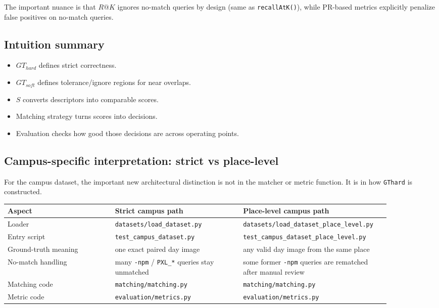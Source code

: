 \documentclass[11pt]{article}
\newcommand{\file}[1]{\texttt{#1}}
\begin{document}
The important nuance is that $R@K$ ignores no-match queries by design (same as \file{recallAtK()}), while PR-based metrics explicitly penalize false positives on no-match queries.

\subsection{Intuition summary}
\begin{itemize}[leftmargin=*]
  \item $GT_{hard}$ defines strict correctness.
  \item $GT_{soft}$ defines tolerance/ignore regions for near overlaps.
  \item $S$ converts descriptors into comparable scores.
  \item Matching strategy turns scores into decisions.
  \item Evaluation checks how good those decisions are across operating points.
\end{itemize}

\subsection{Campus-specific interpretation: strict vs place-level}
For the campus dataset, the important new architectural distinction is not in the matcher or metric function. It is in how \texttt{GThard} is constructed.

\begin{longtable}{p{0.26\linewidth} p{0.31\linewidth} p{0.31\linewidth}}
\toprule
\textbf{Aspect} & \textbf{Strict campus path} & \textbf{Place-level campus path} \\
\midrule
Loader & \file{datasets/load\_dataset.py} & \file{datasets/load\_dataset\_place\_level.py} \\
Entry script & \file{test\_campus\_dataset.py} & \file{test\_campus\_dataset\_place\_level.py} \\
Ground-truth meaning & one exact paired day image & any valid day image from the same place \\
No-match handling & many \texttt{-npm} / \texttt{PXL\_*} queries stay unmatched & some former \texttt{-npm} queries are rematched after manual review \\
Matching code & \file{matching/matching.py} & \file{matching/matching.py} \\
Metric code & \file{evaluation/metrics.py} & \file{evaluation/metrics.py} \\
\bottomrule
\end{longtable}
\end{document}
